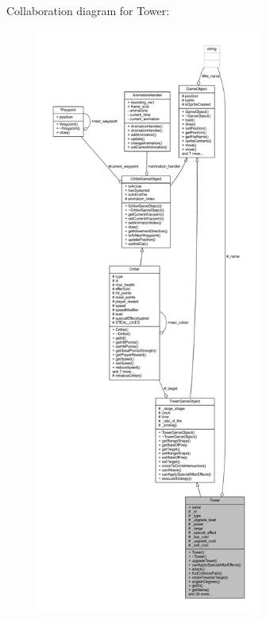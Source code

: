 Collaboration diagram for Tower\+:
\nopagebreak
\begin{figure}[H]
\begin{center}
\leavevmode
\includegraphics[height=550pt]{class_tower__coll__graph}
\end{center}
\end{figure}
